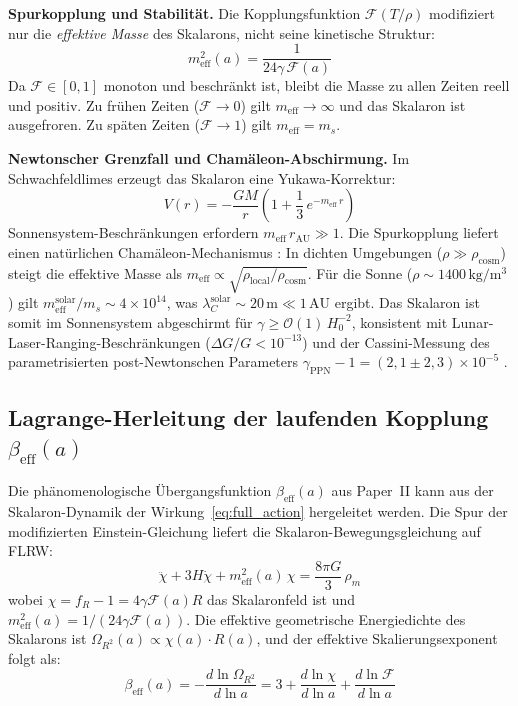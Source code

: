 \documentclass[11pt,a4paper]{article}
\begin{document}
\textbf{Spurkopplung und Stabilit\"at.} Die Kopplungsfunktion $\mathcal{F}(T/\rho)$ modifiziert nur die \textit{effektive Masse} des Skalarons, nicht seine kinetische Struktur:
\begin{equation}
m_{\mathrm{eff}}^2(a) = \frac{1}{24\gamma\,\mathcal{F}(a)}
\end{equation}
Da $\mathcal{F} \in [0,1]$ monoton und beschr\"ankt ist, bleibt die Masse zu allen Zeiten reell und positiv. Zu fr\"uhen Zeiten ($\mathcal{F} \to 0$) gilt $m_{\mathrm{eff}} \to \infty$ und das Skalaron ist ausgefroren. Zu sp\"aten Zeiten ($\mathcal{F} \to 1$) gilt $m_{\mathrm{eff}} = m_s$.

\textbf{Newtonscher Grenzfall und Cham\"aleon-Abschirmung.} Im Schwachfeldlimes erzeugt das Skalaron eine Yukawa-Korrektur:
\begin{equation}
V(r) = -\frac{GM}{r}\left(1 + \frac{1}{3}\,e^{-m_{\mathrm{eff}}\,r}\right)
\label{eq:yukawa}
\end{equation}
Sonnensystem-Beschr\"ankungen erfordern $m_{\mathrm{eff}}\,r_{\mathrm{AU}} \gg 1$. Die Spurkopplung liefert einen nat\"urlichen Cham\"aleon-Mechanismus \cite{Khoury2004}: In dichten Umgebungen ($\rho \gg \rho_{\mathrm{cosm}}$) steigt die effektive Masse als $m_{\mathrm{eff}} \propto \sqrt{\rho_{\mathrm{local}}/\rho_{\mathrm{cosm}}}$. F\"ur die Sonne ($\rho \sim 1400\,\mathrm{kg/m^3}$) gilt $m_{\mathrm{eff}}^{\mathrm{solar}}/m_s \sim 4 \times 10^{14}$, was $\lambda_C^{\mathrm{solar}} \sim 20\,\mathrm{m} \ll 1\,\mathrm{AU}$ ergibt. Das Skalaron ist somit im Sonnensystem abgeschirmt f\"ur $\gamma \geq \mathcal{O}(1)\,H_0^{-2}$, konsistent mit Lunar-Laser-Ranging-Beschr\"ankungen ($\Delta G/G < 10^{-13}$) \cite{Williams2004} und der Cassini-Messung des parametrisierten post-Newtonschen Parameters $\gamma_{\mathrm{PPN}} - 1 = (2{,}1 \pm 2{,}3) \times 10^{-5}$ \cite{Bertotti2003}.

\subsection{Lagrange-Herleitung der laufenden Kopplung $\beta_{\mathrm{eff}}(a)$}
\label{subsec:beta_derivation}

Die ph\"anomenologische \"Ubergangsfunktion $\beta_{\mathrm{eff}}(a)$ aus Paper~II kann aus der Skalaron-Dynamik der Wirkung~\eqref{eq:full_action} hergeleitet werden. Die Spur der modifizierten Einstein-Gleichung liefert die Skalaron-Bewegungsgleichung auf FLRW:
\begin{equation}
\ddot{\chi} + 3H\dot{\chi} + m_{\mathrm{eff}}^2(a)\,\chi = \frac{8\pi G}{3}\,\rho_m
\label{eq:scalaron_eom}
\end{equation}
wobei $\chi = f_R - 1 = 4\gamma\mathcal{F}(a) R$ das Skalaronfeld ist und $m_{\mathrm{eff}}^2(a) = 1/(24\gamma\mathcal{F}(a))$. Die effektive geometrische Energiedichte des Skalarons ist $\Omega_{R^2}(a) \propto \chi(a) \cdot R(a)$, und der effektive Skalierungsexponent folgt als:
\begin{equation}
{\beta_{\mathrm{eff}}(a) = -\frac{d\ln\Omega_{R^2}}{d\ln a} = 3 + \frac{d\ln\chi}{d\ln a} + \frac{d\ln\mathcal{F}}{d\ln a}}
\label{eq:beta_from_lagrangian}
\end{equation}
\end{document}
